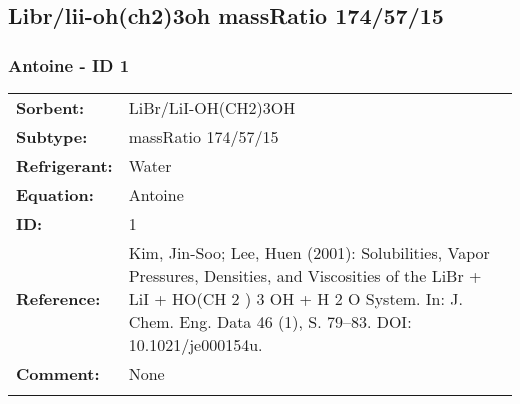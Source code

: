 \subsection{Libr/lii-oh(ch2)3oh massRatio 174/57/15}
%
\subsubsection{Antoine - ID 1}
%
\begin{tabular}[l]{|lp{11.5cm}|}
\hline
\addlinespace

\textbf{Sorbent:} & LiBr/LiI-OH(CH2)3OH \\
\textbf{Subtype:} & massRatio 174/57/15 \\
\textbf{Refrigerant:} & Water  \\
\textbf{Equation:} & Antoine \\
\textbf{ID:} & 1 \\
\textbf{Reference:} & Kim, Jin-Soo; Lee, Huen (2001): Solubilities, Vapor Pressures, Densities, and Viscosities of the LiBr + LiI + HO(CH 2 ) 3 OH + H 2 O System. In: J. Chem. Eng. Data 46 (1), S. 79–83. DOI: 10.1021/je000154u. \\
\textbf{Comment:} & None \\

\addlinespace
\hline
\end{tabular}
\newline

